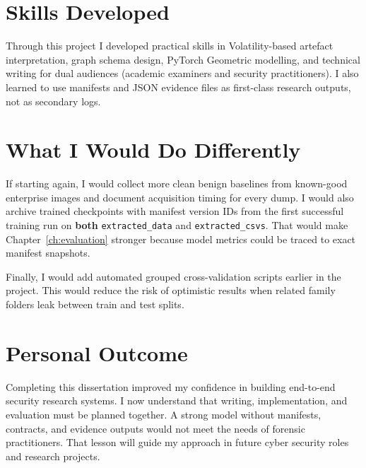 \section{Skills Developed}

Through this project I developed practical skills in Volatility-based artefact interpretation, graph schema design, PyTorch Geometric modelling, and technical writing for dual audiences (academic examiners and security practitioners). I also learned to use manifests and JSON evidence files as first-class research outputs, not as secondary logs.

\section{What I Would Do Differently}

If starting again, I would collect more clean benign baselines from known-good enterprise images and document acquisition timing for every dump. I would also archive trained checkpoints with manifest version IDs from the first successful training run on \textbf{both} \texttt{extracted\_data} and \texttt{extracted\_csvs}. That would make Chapter~\ref{ch:evaluation} stronger because model metrics could be traced to exact manifest snapshots.

Finally, I would add automated grouped cross-validation scripts earlier in the project. This would reduce the risk of optimistic results when related family folders leak between train and test splits.

\section{Personal Outcome}

Completing this dissertation improved my confidence in building end-to-end security research systems. I now understand that writing, implementation, and evaluation must be planned together. A strong model without manifests, contracts, and evidence outputs would not meet the needs of forensic practitioners. That lesson will guide my approach in future cyber security roles and research projects.
